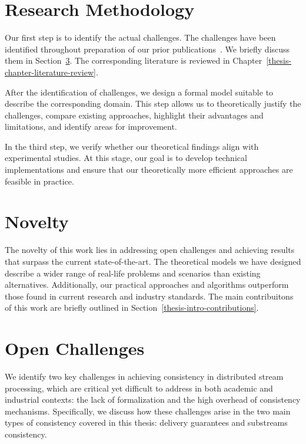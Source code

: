 \section{Research Methodology}

Our first step is to identify the actual challenges. The challenges have been identified throughout preparation of our prior publications~\cite{we2018adbis, trofimov2018consistency, we2018seim, we2018beyondmr, we2019debs, webirte, thepaper, 10.1145/3524860.3539809, trofimov2023bounding}. We briefly discuss them in Section~\ref{thesis-intro-challenges}. The corresponding literature is reviewed in Chapter~\ref{thesis-chapter-literature-review}.

After the identification of challenges, we design a formal model suitable to describe the corresponding domain. This step allows us to theoretically justify the challenges, compare existing approaches, highlight their advantages and limitations, and identify areas for improvement.

In the third step, we verify whether our theoretical findings align with experimental studies. At this stage, our goal is to develop technical implementations and ensure that our theoretically more efficient approaches are feasible in practice.

\section{Novelty}

The novelty of this work lies in addressing open challenges and achieving results that surpass the current state-of-the-art. The theoretical models we have designed describe a wider range of real-life problems and scenarios than existing alternatives. Additionally, our practical approaches and algorithms outperform those found in current research and industry standards. The main contribuitons of this work are briefly outlined in Section~\ref{thesis-intro-contributions}.

\section{Open Challenges}
\label{thesis-intro-challenges}

We identify two key challenges in achieving consistency in distributed stream processing, which are critical yet difficult to address in both academic and industrial contexts: the lack of formalization and the high overhead of consistency mechanisms. Specifically, we discuss how these challenges arise in the two main types of consistency covered in this thesis: delivery guarantees and substreams consistency.

